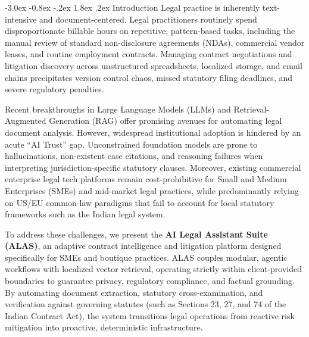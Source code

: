 \documentclass[3p,times,procedia]{elsarticle}
\makeatletter
\renewcommand\section{\@startsection {section}{1}{\z@}%
                                   {-3.0ex \@plus -0.8ex \@minus -.2ex}%
                                   {1.8ex \@plus.2ex}%
                                   {\fontsize{10}{12}\selectfont\bfseries\scshape}}
\makeatother
\begin{document}
\section{Introduction}
\label{main}
Legal practice is inherently text-intensive and document-centered. Legal practitioners routinely spend disproportionate billable hours on repetitive, pattern-based tasks, including the manual review of standard non-disclosure agreements (NDAs), commercial vendor leases, and routine employment contracts. Managing contract negotiations and litigation discovery across unstructured spreadsheets, localized storage, and email chains precipitates version control chaos, missed statutory filing deadlines, and severe regulatory penalties.

Recent breakthroughs in Large Language Models (LLMs) and Retrieval-Augmented Generation (RAG) offer promising avenues for automating legal document analysis. However, widespread institutional adoption is hindered by an acute ``AI Trust'' gap. Unconstrained foundation models are prone to hallucinations, non-existent case citations, and reasoning failures when interpreting jurisdiction-specific statutory clauses. Moreover, existing commercial enterprise legal tech platforms remain cost-prohibitive for Small and Medium Enterprises (SMEs) and mid-market legal practices, while predominantly relying on US/EU common-law paradigms that fail to account for local statutory frameworks such as the Indian legal system.

To address these challenges, we present the \textbf{AI Legal Assistant Suite (ALAS)}, an adaptive contract intelligence and litigation platform designed specifically for SMEs and boutique practices. ALAS couples modular, agentic workflows with localized vector retrieval, operating strictly within client-provided boundaries to guarantee privacy, regulatory compliance, and factual grounding. By automating document extraction, statutory cross-examination, and verification against governing statutes (such as Sections 23, 27, and 74 of the Indian Contract Act), the system transitions legal operations from reactive risk mitigation into proactive, deterministic infrastructure.
\end{document}
